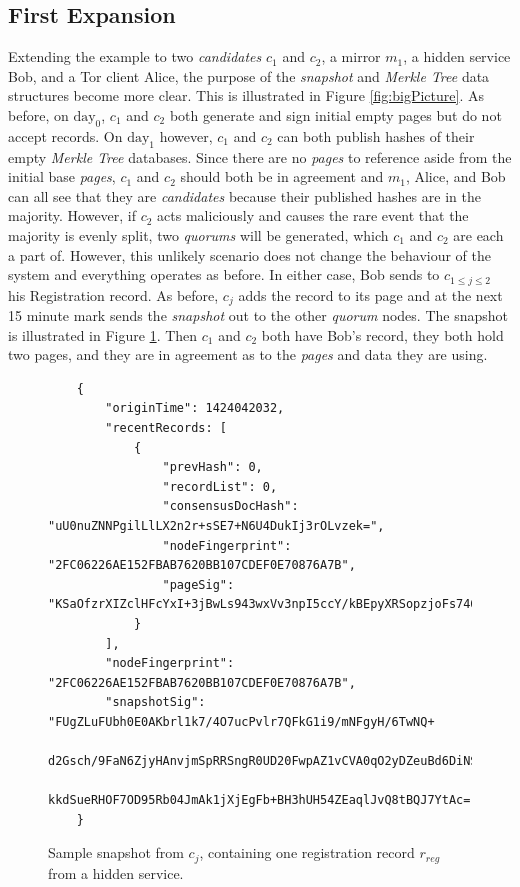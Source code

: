 \subsection{First Expansion}


Extending the example to two \emph{candidates} $ c_{1} $ and $ c_{2} $, a mirror $ m_{1} $, a hidden service Bob, and a Tor client Alice, the purpose of the \emph{snapshot} and \emph{Merkle Tree} data structures become more clear. This is illustrated in Figure \ref{fig:bigPicture}. As before, on $ \textrm{day}_{0} $, $ c_{1} $ and $ c_{2} $ both generate and sign initial empty pages but do not accept records. On $ \textrm{day}_{1} $ however, $ c_{1} $ and $ c_{2} $ can both publish hashes of their empty \emph{Merkle Tree} databases. Since there are no \emph{pages} to reference aside from the initial base \emph{pages}, $ c_{1} $ and $ c_{2} $ should both be in agreement and $ m_{1} $, Alice, and Bob can all see that they are \emph{candidates} because their published hashes are in the majority. However, if $ c_{2} $ acts maliciously and causes the rare event that the majority is evenly split, two \emph{quorums} will be generated, which $ c_{1} $ and $ c_{2} $ are each a part of. However, this unlikely scenario does not change the behaviour of the system and everything operates as before. In either case, Bob sends to $ c_{1 \le j \le 2} $ his Registration record. As before, $ c_{j} $ adds the record to its page and at the next 15 minute mark sends the \emph{snapshot} out to the other \emph{quorum} nodes. The snapshot is illustrated in Figure \ref{fig:sampleSnapshot}. Then $ c_{1} $ and $ c_{2} $ both have Bob's record, they both hold two pages, and they are in agreement as to the \emph{pages} and data they are using.

\begin{figure}
	\begin{lstlisting}
	{
		"originTime": 1424042032,
		"recentRecords: [
			{
				"prevHash": 0,
				"recordList": 0,
				"consensusDocHash": "uU0nuZNNPgilLlLX2n2r+sSE7+N6U4DukIj3rOLvzek=",
				"nodeFingerprint": "2FC06226AE152FBAB7620BB107CDEF0E70876A7B",
				"pageSig": 	"KSaOfzrXIZclHFcYxI+3jBwLs943wxVv3npI5ccY/kBEpyXRSopzjoFs746n0tJqUpdY4Kbe6DBwERaN7ELmSSK9Pu6q8QeKzNAh+QOnKl0fKBN7fqowjkQ3ktFkR0Vuox9WrrbNTMa4+up0Np52hlbKA3zSRz4fbR9NVlh6uuQ="
			}
		],
		"nodeFingerprint": "2FC06226AE152FBAB7620BB107CDEF0E70876A7B",
		"snapshotSig": "FUgZLuFUbh0E0AKbrl1k7/4O7ucPvlr7QFkG1i9/mNFgyH/6TwNQ+
			d2Gsch/9FaN6ZjyHAnvjmSpRRSngR0UD20FwpAZ1vCVA0qO2yDZeuBd6DiNS
			kkdSueRHOF7OD95Rb04JmAk1jXjEgFb+BH3hUH54ZEaqlJvQ8tBQJ7YtAc="
	}
	\end{lstlisting}
	\caption{Sample snapshot from $ c_{j} $, containing one registration record $ r_{reg} $ from a hidden service.}
	\label{fig:sampleSnapshot}
\end{figure}

